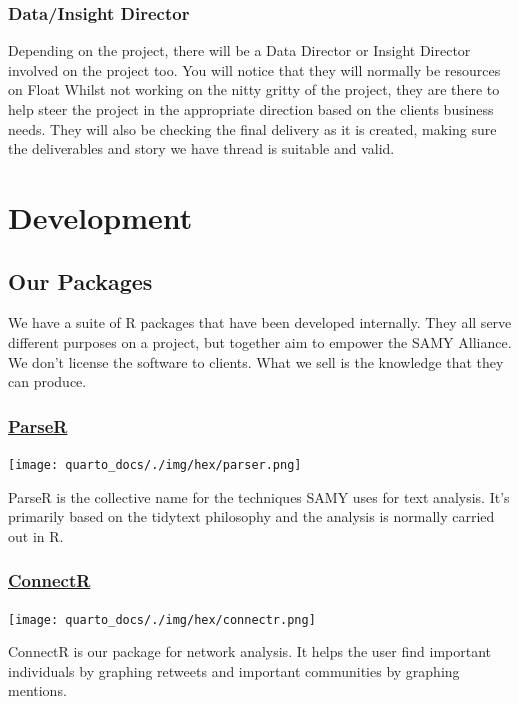 \documentclass[
  letterpaper,
  DIV=11,
  numbers=noendperiod]{scrreprt}
\begin{document}
\section{Data/Insight Director}\label{datainsight-director}

Depending on the project, there will be a Data Director or Insight
Director involved on the project too. You will notice that they will
normally be resources on Float Whilst not working on the nitty gritty of
the project, they are there to help steer the project in the appropriate
direction based on the clients business needs. They will also be
checking the final delivery as it is created, making sure the
deliverables and story we have thread is suitable and valid.

\part{Development}

\chapter{Our Packages}\label{our-packages}

We have a suite of R packages that have been developed internally. They
all serve different purposes on a project, but together aim to empower
the SAMY Alliance. We don't license the software to clients. What we
sell is the knowledge that they can produce.

\section{\texorpdfstring{\href{https://parser.shareldn.com/index.html}{ParseR}}{ParseR}}\label{parser}

\texttt{[image: quarto\_docs/./img/hex/parser.png]}

ParseR is the collective name for the techniques SAMY uses for text
analysis. It's primarily based on the tidytext philosophy and the
analysis is normally carried out in R.

\section{\texorpdfstring{\href{https://avery-island.github.io/ConnectR/index.html}{ConnectR}}{ConnectR}}\label{connectr}

\texttt{[image: quarto\_docs/./img/hex/connectr.png]}

ConnectR is our package for network analysis. It helps the user find
important individuals by graphing retweets and important communities by
graphing mentions.
\end{document}

